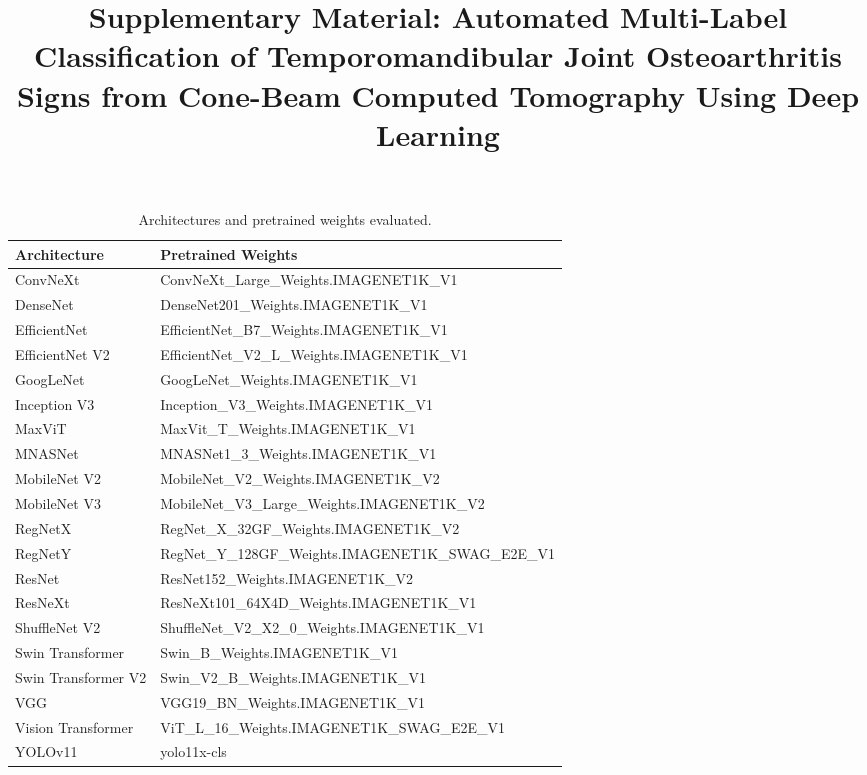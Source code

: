 \documentclass[review,12pt]{elsarticle}
\begin{document}
\begin{frontmatter}
\title{Supplementary Material: Automated Multi-Label Classification of
Temporomandibular Joint Osteoarthritis Signs from Cone-Beam Computed
Tomography Using Deep Learning}
\end{frontmatter}


\begin{table}[htbp]
\centering
\caption{Architectures and pretrained weights evaluated.}
\label{tab:models}
\small
\begin{tabular}{ll}
\toprule
\textbf{Architecture} &
\textbf{Pretrained Weights} \\
\midrule
ConvNeXt            & ConvNeXt\_Large\_Weights.IMAGENET1K\_V1 \\
DenseNet            & DenseNet201\_Weights.IMAGENET1K\_V1 \\
EfficientNet        & EfficientNet\_B7\_Weights.IMAGENET1K\_V1 \\
EfficientNet V2     & EfficientNet\_V2\_L\_Weights.IMAGENET1K\_V1 \\
GoogLeNet           & GoogLeNet\_Weights.IMAGENET1K\_V1 \\
Inception V3        & Inception\_V3\_Weights.IMAGENET1K\_V1 \\
MaxViT              & MaxVit\_T\_Weights.IMAGENET1K\_V1 \\
MNASNet             & MNASNet1\_3\_Weights.IMAGENET1K\_V1 \\
MobileNet V2        & MobileNet\_V2\_Weights.IMAGENET1K\_V2 \\
MobileNet V3        & MobileNet\_V3\_Large\_Weights.IMAGENET1K\_V2 \\
RegNetX             & RegNet\_X\_32GF\_Weights.IMAGENET1K\_V2 \\
RegNetY             & RegNet\_Y\_128GF\_Weights.IMAGENET1K\_SWAG\_E2E\_V1 \\
ResNet              & ResNet152\_Weights.IMAGENET1K\_V2 \\
ResNeXt             & ResNeXt101\_64X4D\_Weights.IMAGENET1K\_V1 \\
ShuffleNet V2       & ShuffleNet\_V2\_X2\_0\_Weights.IMAGENET1K\_V1 \\
Swin Transformer    & Swin\_B\_Weights.IMAGENET1K\_V1 \\
Swin Transformer V2 & Swin\_V2\_B\_Weights.IMAGENET1K\_V1 \\
VGG                 & VGG19\_BN\_Weights.IMAGENET1K\_V1 \\
Vision Transformer  & ViT\_L\_16\_Weights.IMAGENET1K\_SWAG\_E2E\_V1 \\
YOLOv11             & yolo11x-cls \\
\bottomrule
\end{tabular}
\end{table}
\end{document}
